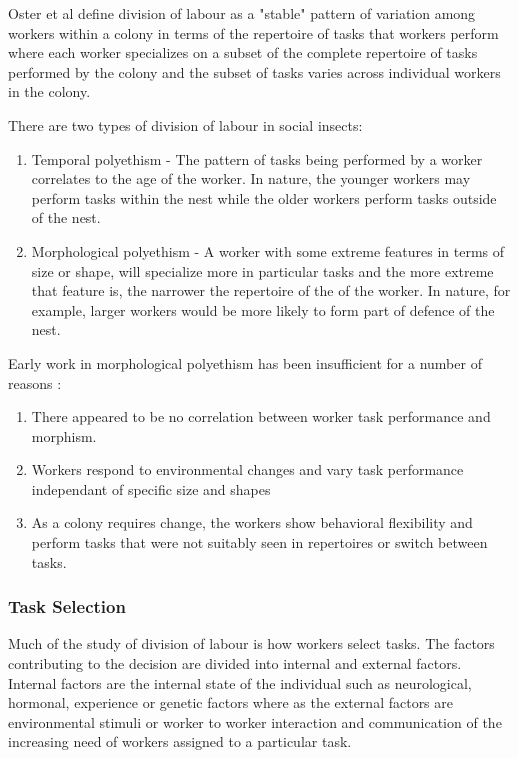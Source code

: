 Oster et al define division of labour as a "stable" pattern of variation among workers within a colony in terms of the repertoire of tasks that workers perform where each worker specializes on a subset of the complete repertoire of tasks performed by the colony and the subset of tasks varies across individual workers in the colony.  \cite{oster1978caste}  %

There are two types of division of labour in social insects: 
\begin{enumerate}
	\item Temporal polyethism - The pattern of tasks being performed by a worker correlates to the age of the worker. In nature, the younger workers may perform tasks within the nest while the older workers perform tasks outside of the nest.
	\item Morphological polyethism - A worker with some extreme features in terms of size or shape, will specialize more in particular tasks and the more extreme that feature is, the narrower the repertoire of the of the worker. In nature, for example, larger workers would be more likely to form part of defence of the nest. \cite{beshers2001models}
\end{enumerate}

Early work in morphological polyethism has been insufficient for a number of reasons \cite{huang1996regulation}: 

\begin{enumerate}
	\item There appeared to be no correlation between worker task performance and morphism.
	\item Workers respond to environmental changes and vary task performance independant of specific size and shapes
	\item As a colony requires change, the workers show behavioral flexibility and perform tasks that were not suitably seen in repertoires or switch between tasks.
\end{enumerate}

\subsubsection{Task Selection}
Much of the study of division of labour is how workers select tasks. The factors contributing to the decision are divided into internal and external factors. Internal factors are the internal state of the individual such as neurological, hormonal, experience or genetic factors where as the external factors are environmental stimuli or worker to worker interaction and communication of the increasing need of workers assigned to a particular task. \cite{beshers2001models}

